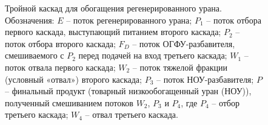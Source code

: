 \begin{figure}[ht]
  \caption{Тройной каскад для обогащения регенерированного урана. Обозначения: $E$ -- поток регенерированного урана; $P_1$ -- поток отбора первого каскада, выступающий питанием второго каскада; $P_2$ -- поток отбора второго каскада; $F_{D}$ -- поток ОГФУ-разбавителя, смешиваемого с $P_2$ перед подачей на вход третьего каскада; $W_1$ -- поток отвала первого каскада; $W_2$ -- поток тяжелой фракции (условный «отвал») второго каскада; $P_3$ -- поток НОУ-разбавителя; $P$ -- финальный продукт (товарный низкообогащенный уран (НОУ)), полученный смешиванием потоков $W_2$, $P_3$ и $P_4$, где $P_4$ -- отбор третьего каскада; $W_4$ -- отвал третьего каскада.}\label{p2_withDepU}
\end{figure}


